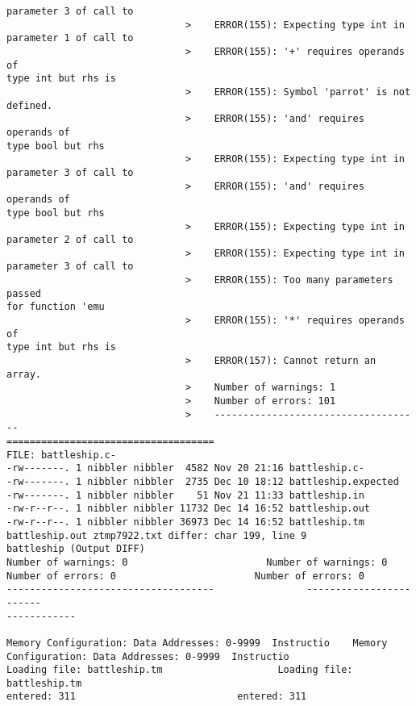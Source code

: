 \documentclass[12pt]{book}
\begin{document}
\begin{lstlisting}
parameter 3 of call to
                               >    ERROR(155): Expecting type int in 
parameter 1 of call to
                               >    ERROR(155): '+' requires operands of 
type int but rhs is
                               >    ERROR(155): Symbol 'parrot' is not 
defined.
                               >    ERROR(155): 'and' requires operands of 
type bool but rhs
                               >    ERROR(155): Expecting type int in 
parameter 3 of call to
                               >    ERROR(155): 'and' requires operands of 
type bool but rhs
                               >    ERROR(155): Expecting type int in 
parameter 2 of call to
                               >    ERROR(155): Expecting type int in 
parameter 3 of call to
                               >    ERROR(155): Too many parameters passed 
for function 'emu
                               >    ERROR(155): '*' requires operands of 
type int but rhs is
                               >    ERROR(157): Cannot return an array.
                               >    Number of warnings: 1
                               >    Number of errors: 101
                               >    ------------------------------------
====================================
FILE: battleship.c-
-rw-------. 1 nibbler nibbler  4582 Nov 20 21:16 battleship.c-
-rw-------. 1 nibbler nibbler  2735 Dec 10 18:12 battleship.expected
-rw-------. 1 nibbler nibbler    51 Nov 21 11:33 battleship.in
-rw-r--r--. 1 nibbler nibbler 11732 Dec 14 16:52 battleship.out
-rw-r--r--. 1 nibbler nibbler 36973 Dec 14 16:52 battleship.tm
battleship.out ztmp7922.txt differ: char 199, line 9
battleship (Output DIFF)
Number of warnings: 0                        Number of warnings: 0
Number of errors: 0                        Number of errors: 0
------------------------------------                ------------------------
------------

Memory Configuration: Data Addresses: 0-9999  Instructio    Memory 
Configuration: Data Addresses: 0-9999  Instructio
Loading file: battleship.tm                    Loading file: battleship.tm
entered: 311                            entered: 311


\end{lstlisting}
\end{document}
